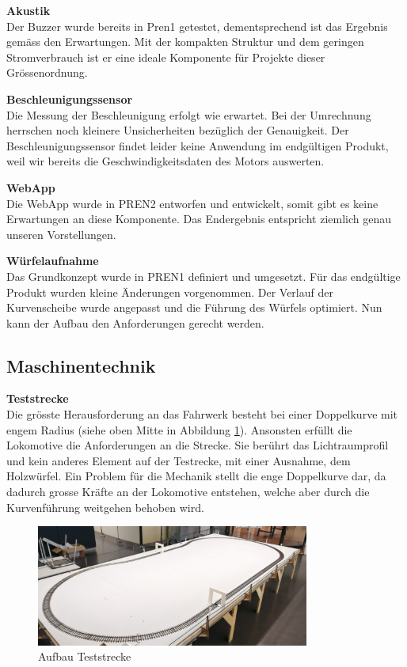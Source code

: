 \documentclass[../../main.tex]{subfiles}
\begin{document}
\textbf{Akustik}\\
Der Buzzer wurde bereits in Pren1 getestet, dementsprechend ist das Ergebnis gemäss den Erwartungen. Mit der kompakten Struktur und dem geringen Stromverbrauch ist er eine ideale Komponente für Projekte dieser Grössenordnung.

\textbf{Beschleunigungssensor}\\
Die Messung der Beschleunigung erfolgt wie erwartet. Bei der Umrechnung herrschen noch kleinere Unsicherheiten bezüglich der Genauigkeit. Der Beschleunigungssensor findet leider keine Anwendung im endgültigen Produkt, weil wir bereits die Geschwindigkeitsdaten des Motors auswerten.

\textbf{WebApp}\\
Die WebApp wurde in PREN2 entworfen und entwickelt, somit gibt es keine Erwartungen an diese Komponente. Das Endergebnis entspricht ziemlich genau unseren Vorstellungen.

\textbf{Würfelaufnahme}\\
Das Grundkonzept wurde in PREN1 definiert und umgesetzt. Für das endgültige Produkt wurden kleine Änderungen vorgenommen. Der Verlauf der Kurvenscheibe wurde angepasst und die Führung des Würfels optimiert. Nun kann der Aufbau den Anforderungen gerecht werden.

\pagebreak

\subsection{Maschinentechnik}

\textbf{Teststrecke}\\
Die grösste Herausforderung an das Fahrwerk besteht bei einer Doppelkurve mit engem Radius (siehe oben Mitte in Abbildung \ref{fig:teststrecke1}). Ansonsten erfüllt die Lokomotive die Anforderungen an die Strecke. Sie berührt das Lichtraumprofil und kein anderes Element auf der Testrecke, mit einer Ausnahme, dem Holzwürfel. Ein Problem für die Mechanik stellt die enge Doppelkurve dar, da dadurch grosse Kräfte an der Lokomotive entstehen, welche aber durch die Kurvenführung weitgehen behoben wird.\\

\begin{figure}[H]
    \centering
    \includegraphics[width=0.8\textwidth]{teststrecke1.PNG}
    \caption {Aufbau Teststrecke}
    \label{fig:teststrecke1}
  \end{figure}
\end{document}
